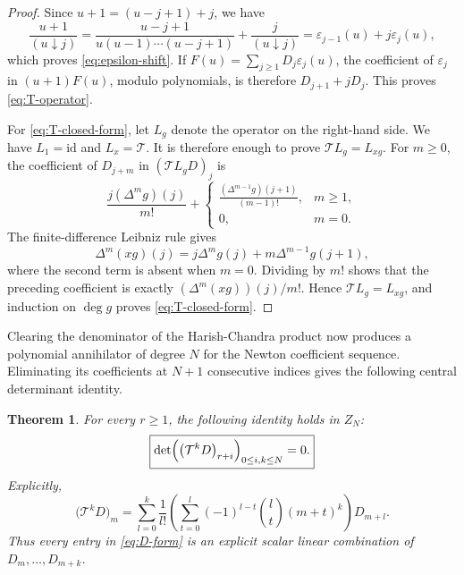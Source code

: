 \documentclass[11pt]{amsart}
\numberwithin{equation}{section}
\newtheorem{theorem}{Theorem}[section]
\theoremstyle{definition}
\theoremstyle{remark}
\newcommand{\fall}[2]{(#1\mathbin{\downarrow}#2)}
\begin{document}
\begin{proof}
Since \(u+1=(u-j+1)+j\), we have
\[
 \frac{u+1}{\fall{u}{j}}
 =\frac{u-j+1}{u(u-1)\cdots(u-j+1)}
  +\frac{j}{\fall{u}{j}}
 =\varepsilon_{j-1}(u)+j\varepsilon_j(u),
\]
which proves \eqref{eq:epsilon-shift}.  If
\(F(u)=\sum_{j\geq1}D_j\varepsilon_j(u)\), the coefficient of
\(\varepsilon_j\) in \((u+1)F(u)\), modulo polynomials, is therefore
\(D_{j+1}+jD_j\).  This proves \eqref{eq:T-operator}.

For \eqref{eq:T-closed-form}, let \(L_g\) denote the operator on the
right-hand side.  We have \(L_1=\mathrm{id}\) and
\(L_x=\mathcal T\).  It is therefore enough to prove
\(\mathcal T L_g=L_{xg}\).  For \(m\geq0\), the coefficient of
\(D_{j+m}\) in \((\mathcal TL_gD)_j\) is
\[
 \frac{j(\Delta^mg)(j)}{m!}
 +\begin{cases}
 \displaystyle
 \frac{(\Delta^{m-1}g)(j+1)}{(m-1)!},&m\geq1,\\[6pt]
 0,&m=0.
 \end{cases}
\]
The finite-difference Leibniz rule gives
\[
 \Delta^m(xg)(j)
 =j\Delta^mg(j)+m\Delta^{m-1}g(j+1),
\]
where the second term is absent when \(m=0\).  Dividing by \(m!\)
shows that the preceding coefficient is exactly
\((\Delta^m(xg))(j)/m!\).  Hence
\(\mathcal TL_g=L_{xg}\), and induction on \(\deg g\) proves
\eqref{eq:T-closed-form}.
\end{proof}

Clearing the denominator of the Harish-Chandra product now produces
a polynomial annihilator of degree \(N\) for the Newton coefficient
sequence.  Eliminating its coefficients at \(N+1\) consecutive indices
gives the following central determinant identity.

\begin{theorem}
\label{thm:D-form}
For every \(r\geq1\), the following identity holds in \(Z_N\):
\begin{equation}
 \boxed{
 \det\Bigl(\bigl(\mathcal T^kD\bigr)_{r+i}
      \Bigr)_{0\leq i,k\leq N}=0.}
 \label{eq:D-form}
\end{equation}
Explicitly,
\begin{equation}
 \bigl(\mathcal T^kD\bigr)_m
 =\sum_{l=0}^{k}\frac{1}{l!}
  \left(
   \sum_{t=0}^{l}(-1)^{l-t}\binom{l}{t}(m+t)^k
  \right)D_{m+l}.
 \label{eq:T-power-explicit}
\end{equation}
Thus every entry in \eqref{eq:D-form} is an explicit scalar linear
combination of \(D_m,\ldots,D_{m+k}\).
\end{theorem}
\end{document}
